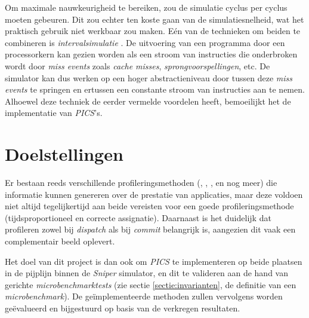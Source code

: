 \documentclass[12pt,a4paper,faculty=ea,language=nl]{ugent-doc}
\begin{document}
Om maximale nauwkeurigheid te bereiken, zou de simulatie cyclus per cyclus moeten gebeuren. Dit zou echter ten koste gaan van de simulatiesnelheid, wat het praktisch gebruik niet werkbaar zou maken. Eén van de technieken om beiden te combineren is \textit{intervalsimulatie} \cite{sniper_web}. De uitvoering van een programma door een processorkern kan gezien worden als een stroom van instructies die onderbroken wordt door \textit{miss events} zoals \textit{cache misses}, \textit{sprongvoorspellingen}, etc. De simulator kan dus werken op een hoger abstractieniveau door tussen deze \textit{miss events} te springen en ertussen een constante stroom van instructies aan te nemen. Alhoewel deze techniek de eerder vermelde voordelen heeft, bemoeilijkt het de implementatie van \textit{PICS}'s.

\section{Doelstellingen}
Er bestaan reeds verschillende profileringsmethoden (\cite{acm}, \cite{arm}, \cite{micro}, en nog meer) die informatie kunnen genereren over de prestatie van applicaties, maar deze voldoen niet altijd tegelijkertijd aan beide vereisten voor een goede profileringsmethode (tijdsproportioneel en correcte assignatie). Daarnaast is het duidelijk dat profileren zowel bij \textit{dispatch} als bij \textit{commit} belangrijk is, aangezien dit vaak een complementair beeld oplevert.

Het doel van dit project is dan ook om \textit{PICS} te implementeren op beide plaatsen in de pijplijn binnen de \textit{Sniper} simulator, en dit te valideren aan de hand van gerichte \textit{microbenchmarktests} (zie sectie \ref{sectie:invarianten}, de definitie van een \textit{microbenchmark}). De geïmplementeerde methoden zullen vervolgens worden geëvalueerd en bijgestuurd op basis van de verkregen resultaten.
\end{document}
